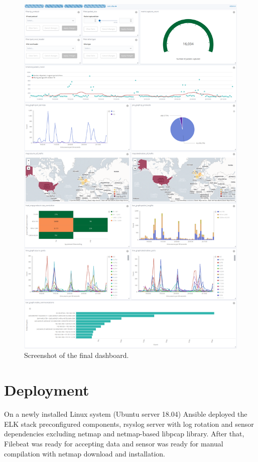 \documentclass[12pt,a4paper,twoside]{report}
\begin{document}
		\begin{figure}
			\centering
			\includegraphics[scale=0.2]{final_dashboard}
			\caption{Screenshot of the final dashboard.}
			\label{figure:dashboard}
		\end{figure}
	\section{Deployment}
		On a newly installed Linux system (Ubuntu server 18.04) Ansible deployed the ELK stack preconfigured components, rsyslog server with log rotation and sensor dependencies excluding netmap and netmap-based libpcap library. After that, Filebeat was ready for accepting data and sensor was ready for manual compilation with netmap download and installation.
\end{document}
